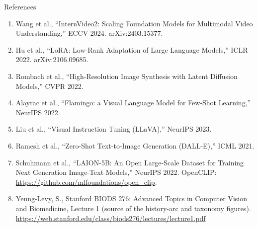 \begin{frame}[allowframebreaks]{References}
\begin{enumerate}
    \item Wang et al., ``InternVideo2: Scaling Foundation Models for Multimodal Video Understanding,'' ECCV 2024. arXiv:2403.15377.
    \item Hu et al., ``LoRA: Low-Rank Adaptation of Large Language Models,'' ICLR 2022. arXiv:2106.09685.
    \item Rombach et al., ``High-Resolution Image Synthesis with Latent Diffusion Models,'' CVPR 2022.
    \item Alayrac et al., ``Flamingo: a Visual Language Model for Few-Shot Learning,'' NeurIPS 2022.
    \item Liu et al., ``Visual Instruction Tuning (LLaVA),'' NeurIPS 2023.
    \item Ramesh et al., ``Zero-Shot Text-to-Image Generation (DALL-E),'' ICML 2021.
    \item Schuhmann et al., ``LAION-5B: An Open Large-Scale Dataset for Training Next Generation Image-Text Models,'' NeurIPS 2022. OpenCLIP: \url{https://github.com/mlfoundations/open_clip}.
    \item Yeung-Levy, S., Stanford BIODS 276: Advanced Topics in Computer Vision and Biomedicine, Lecture 1 (source of the history-arc and taxonomy figures).\\
    \url{https://web.stanford.edu/class/biods276/lectures/lecture1.pdf}
  \end{enumerate}
\end{frame}
